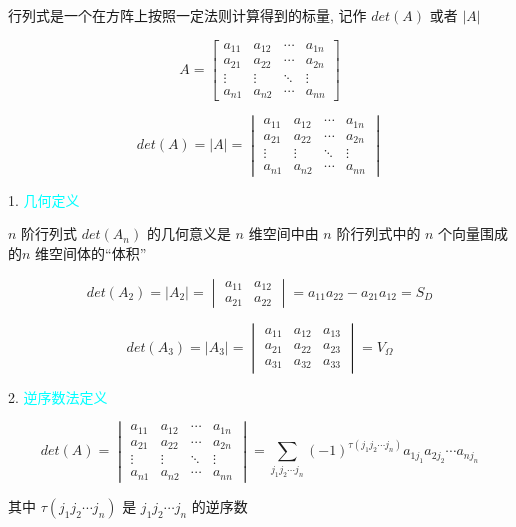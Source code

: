 \begin{definition}[行列式]
	行列式是一个在方阵上按照一定法则计算得到的标量, 记作 $det(A)$ 或者 $|A|$

	$$A = \begin{bmatrix}
		a_{11} & a_{12} & \cdots & a_{1n}\\
		a_{21} & a_{22} & \cdots & a_{2n}\\
		\vdots & \vdots & \ddots & \vdots\\
		a_{n1} & a_{n2} & \cdots & a_{nn}
	\end{bmatrix}$$

	$$det(A) = |A| = \begin{vmatrix}
		a_{11} & a_{12} & \cdots & a_{1n}\\
		a_{21} & a_{22} & \cdots & a_{2n}\\
		\vdots & \vdots & \ddots & \vdots\\
		a_{n1} & a_{n2} & \cdots & a_{nn}
	\end{vmatrix}$$

1. \textcolor{cyan}{几何定义}

$n$ 阶行列式 $det(A_{n})$ 的几何意义是 $n$ 维空间中由 $n$ 阶行列式中的 $n$ 个向量围成的$n$ 维空间体的``体积''

$$ det(A_{2}) = |A_{2}| = 
\begin{vmatrix}
	a_{11} & a_{12}\\
	a_{21} & a_{22}
\end{vmatrix} = a_{11}a_{22} - a_{21}a_{12} = S_{D}$$

$$ det(A_{3}) =  |A_{3}| = 
\begin{vmatrix}
	a_{11} & a_{12} & a_{13}\\
	a_{21} & a_{22} & a_{23}\\
	a_{31} & a_{32} & a_{33}
\end{vmatrix} = V_{\Omega}$$

2. \textcolor{cyan}{逆序数法定义}


$$ det(A) = \begin{vmatrix}
	a_{11} & a_{12} & \cdots & a_{1n}\\
	a_{21} & a_{22} & \cdots & a_{2n}\\
	\vdots & \vdots & \ddots & \vdots\\
	a_{n1} & a_{n2} & \cdots & a_{nn}
\end{vmatrix} = 
\sum\limits_{j_{1}j_{2}\cdots j_{n}}(-1)^{\tau(j_{1}j_{2}\cdots j_{n})}a_{1 j_{1}}a_{2j_{2}}\cdots a_{n j_{n}}$$

其中 $\tau(j_{1}j_{2}\cdots j_{n})$ 是 $j_{1}j_{2}\cdots j_{n}$ 的逆序数
\end{definition}

